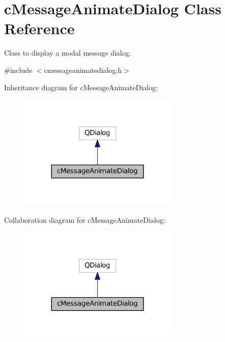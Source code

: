 \hypertarget{classc_message_animate_dialog}{}\section{c\+Message\+Animate\+Dialog Class Reference}
\label{classc_message_animate_dialog}


Class to display a modal message dialog.  




{\ttfamily \#include $<$cmessageanimatedialog.\+h$>$}



Inheritance diagram for c\+Message\+Animate\+Dialog\+:
\nopagebreak
\begin{figure}[H]
\begin{center}
\leavevmode
\includegraphics[width=215pt]{classc_message_animate_dialog__inherit__graph}
\end{center}
\end{figure}


Collaboration diagram for c\+Message\+Animate\+Dialog\+:
\nopagebreak
\begin{figure}[H]
\begin{center}
\leavevmode
\includegraphics[width=215pt]{classc_message_animate_dialog__coll__graph}
\end{center}
\end{figure}
